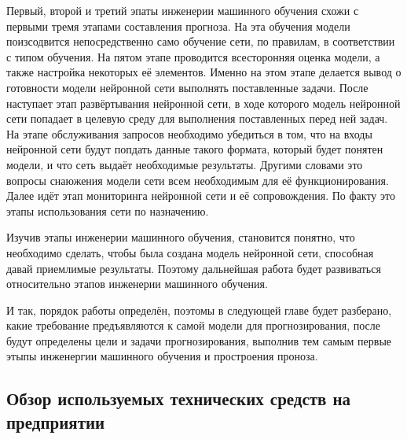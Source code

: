{  \par \redline Первый, второй и третий эпаты инженерии машинного обучения схожи с первыми тремя этапами составления прогноза. На эта обучения модели поизсодвится непосредственно само обучение сети, по правилам, в соответствии с типом обучения. На пятом этапе проводится всесторонняя оценка модели, а также настройка некоторых её элементов. Именно на этом этапе делается вывод о готовности модели нейронной сети выполнять поставленные задачи. После наступает этап развёртывания нейронной сети, в ходе которого модель нейронной сети попадает в целевую среду для выполнения поставленных перед ней задач. На этапе обслуживания запросов необходимо убедиться в том, что на входы нейронной сети будут попдать данные такого формата, который будет понятен модели, и что сеть выдаёт необходимые результаты. Другими словами это вопросы снаюжения модели сети всем необходимым для её функционирования. Далее идёт этап мониторинга нейронной сети и её сопровождения. По факту это этапы использования сети по назначению.    

  \par \redline Изучив этапы инженерии машинного обучения, становится понятно, что необходимо сделать, чтобы была создана модель нейронной сети, способная давай приемлимые результаты. Поэтому дальнейшая работа будет развиваться относительно этапов инженерии машинного обучения.

  \par \redline И так, порядок работы определён, поэтомы в следующей главе будет разберано, какие требование предъявляются к самой модели для прогнозирования, после будут определены цели и задачи прогнозирования, выполнив тем самым первые этыпы инженергии машинного обучения и простроения проноза.

  \par
}

\subtitlespace

\subsection*{
  \gostTitleFont
   Обзор используемых технических средств на предприятии
} 

\subtitlespace

